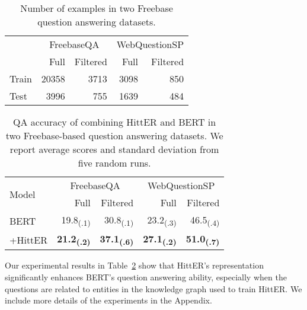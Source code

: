 \documentclass[11pt]{article}
\begin{document}
\begin{table}[t]
\centering
\begin{adjustbox}{max width=\linewidth}
\begin{tabular}{lrrrr}
\toprule
\multirow{2}{*}{} & \multicolumn{2}{c}{FreebaseQA} & \multicolumn{2}{c}{WebQuestionSP} \\\cmidrule(r{4pt}){2-3} \cmidrule(l){4-5}
                  & Full   & Filtered  & Full    & Filtered    \\\midrule
Train             & 20358          & 3713          & 3098            & 850             \\
Test              & 3996           & 755           & 1639            & 484            \\\bottomrule
\end{tabular}
\end{adjustbox}
\caption{Number of examples in two Freebase question answering datasets.}
\label{tab:qa-dataset-statistics}
\end{table} \begin{table}[t]
\centering
\begin{adjustbox}{max width=\linewidth}
\begin{tabular}{lrrrr}
\toprule
\multirow{2}{*}{Model} & \multicolumn{2}{c}{FreebaseQA} & \multicolumn{2}{c}{WebQuestionSP} \\\cmidrule(r{4pt}){2-3} \cmidrule(l){4-5}
                  & Full   & Filtered  & Full    & Filtered   \\\midrule
BERT              & 19.8\textsubscript{(.1)} & 30.8\textsubscript{(.1)}        & 23.2\textsubscript{(.3)} & 46.5\textsubscript{(.4)} \\
+HittER           & \textbf{21.2\textsubscript{(.2)}}          & \textbf{37.1\textsubscript{(.6)}}        & \textbf{27.1\textsubscript{(.2)}}          & \textbf{51.0\textsubscript{(.7)}}         \\\bottomrule
\end{tabular}
\end{adjustbox}
\caption{QA accuracy of combining HittER and BERT in two Freebase-based question answering datasets. We report average scores and standard deviation from five random runs.}
\label{tab:qa-results}
\end{table} 
Our experimental results in Table~\ref{tab:qa-results} show that HittER's representation significantly enhances BERT's question answering ability, especially when the questions are related to entities in the knowledge graph used to train HittER.
We include more details of the experiments in the Appendix.
\end{document}
